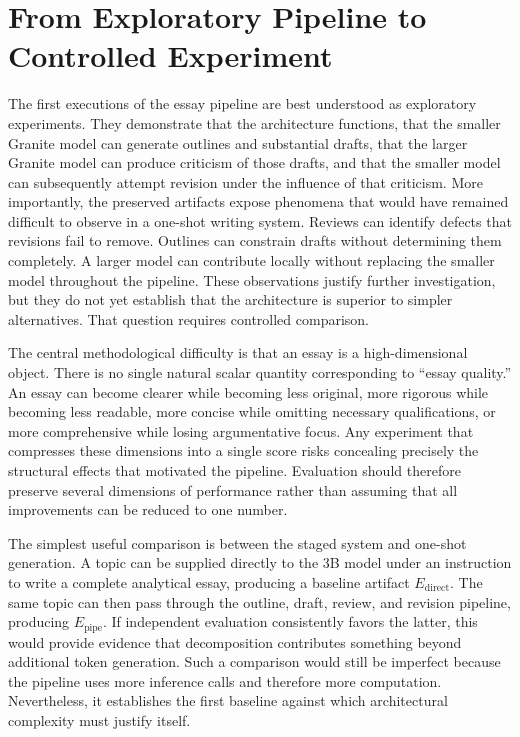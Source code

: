 \documentclass[11pt]{article}
\begin{document}
\section{From Exploratory Pipeline to Controlled Experiment}

The first executions of the essay pipeline are best understood as exploratory experiments. They demonstrate that the architecture functions, that the smaller Granite model can generate outlines and substantial drafts, that the larger Granite model can produce criticism of those drafts, and that the smaller model can subsequently attempt revision under the influence of that criticism. More importantly, the preserved artifacts expose phenomena that would have remained difficult to observe in a one-shot writing system. Reviews can identify defects that revisions fail to remove. Outlines can constrain drafts without determining them completely. A larger model can contribute locally without replacing the smaller model throughout the pipeline. These observations justify further investigation, but they do not yet establish that the architecture is superior to simpler alternatives. That question requires controlled comparison.

The central methodological difficulty is that an essay is a high-dimensional object. There is no single natural scalar quantity corresponding to ``essay quality.'' An essay can become clearer while becoming less original, more rigorous while becoming less readable, more concise while omitting necessary qualifications, or more comprehensive while losing argumentative focus. Any experiment that compresses these dimensions into a single score risks concealing precisely the structural effects that motivated the pipeline. Evaluation should therefore preserve several dimensions of performance rather than assuming that all improvements can be reduced to one number.

The simplest useful comparison is between the staged system and one-shot generation. A topic can be supplied directly to the 3B model under an instruction to write a complete analytical essay, producing a baseline artifact \(E_{\mathrm{direct}}\). The same topic can then pass through the outline, draft, review, and revision pipeline, producing \(E_{\mathrm{pipe}}\). If independent evaluation consistently favors the latter, this would provide evidence that decomposition contributes something beyond additional token generation. Such a comparison would still be imperfect because the pipeline uses more inference calls and therefore more computation. Nevertheless, it establishes the first baseline against which architectural complexity must justify itself.
\end{document}
